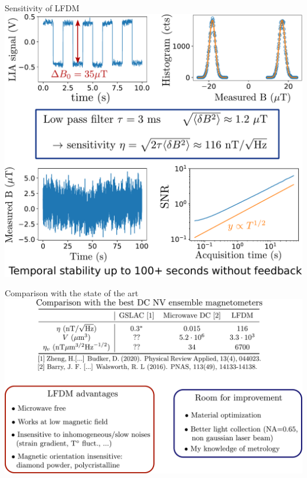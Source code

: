 \documentclass{beamer}
\begin{document}
\begin{frame}{Sensitivity of LFDM}
\centering
\includegraphics[width=\textwidth,height=0.9\textheight,keepaspectratio]{Slide_sensi_LFDM}
\end{frame}

\begin{frame}{Comparison with the state of the art}
\centering
\includegraphics[width=\textwidth,height=0.9\textheight,keepaspectratio]{Slide_comparison_litterature}
\end{frame}
\end{document}
